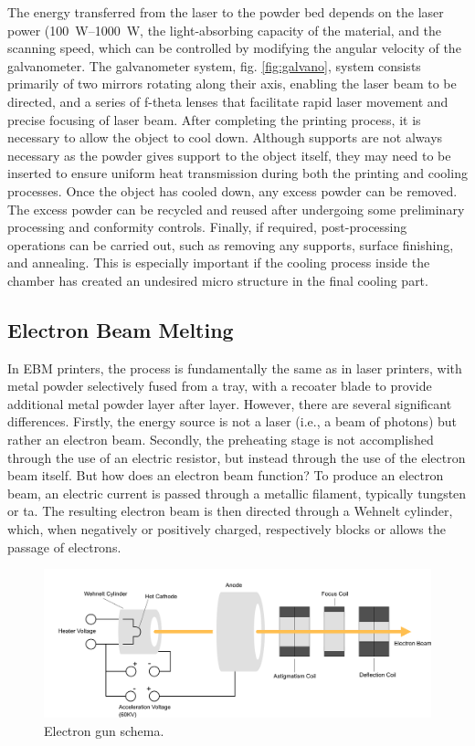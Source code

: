 The energy transferred from the laser to the powder bed depends on the laser power (\SIrange[range-phrase = --]{100}{1000}{\watt}, the light-absorbing capacity of the material, and the scanning speed, which can be controlled by modifying the angular velocity of the galvanometer. The galvanometer system, fig. \ref{fig:galvano}, system consists primarily of two mirrors rotating along their axis, enabling the laser beam to be directed, and a series of f-theta lenses that facilitate rapid laser movement and precise focusing of laser beam. After completing the printing process, it is necessary to allow the object to cool down. Although supports are not always necessary as the powder gives support to the object itself, they may need to be inserted to ensure uniform heat transmission during both the printing and cooling processes. Once the object has cooled down, any excess powder can be removed. The excess powder can be recycled and reused after undergoing some preliminary processing and conformity controls. Finally, if required, post-processing operations can be carried out, such as removing any supports, surface finishing, and annealing. This is especially important if the cooling process inside the chamber has created an undesired micro structure in the final cooling part.

\subsection{Electron Beam Melting}
\label{subsec:ebm}
In EBM printers, the process is fundamentally the same as in laser printers, with metal powder selectively fused from a tray, with a recoater blade to provide additional metal powder layer after layer. However, there are several significant differences. Firstly, the energy source is not a laser (i.e., a beam of photons) but rather an electron beam. Secondly, the preheating stage is not accomplished through the use of an electric resistor, but instead through the use of the electron beam itself. But how does an electron beam function? To produce an electron beam, an electric current is passed through a metallic filament, typically tungsten or ta. The resulting electron beam is then directed through a Wehnelt cylinder, which, when negatively or positively charged, respectively blocks or allows the passage of electrons.

\begin{figure}
    \centering
    \includegraphics[scale=0.5]{Images/EBM.png}
    \caption[Electron gun schema.]{Electron gun schema.}
    \label{fig:electrongun}
\end{figure}

